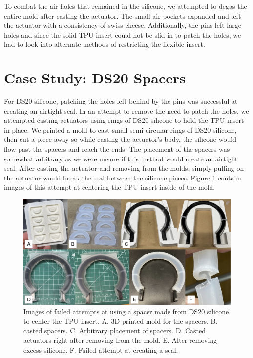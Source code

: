 To combat the air holes that remained in the silicone, we attempted to degas the entire mold after casting the actuator. The small air pockets expanded and left the actuator with a consistency of swiss cheese. Additionally, the pins left large holes and since the solid TPU insert could not be slid in to patch the holes, we had to look into alternate methods of restricting the flexible insert. 

\section{Case Study: DS20 Spacers}

For DS20 silicone, patching the holes left behind by the pins was successful at creating an airtight seal. In an attempt to remove the need to patch the holes, we attempted casting actuators using rings of DS20 silicone to hold the TPU insert in place. We printed a mold to cast small semi-circular rings of DS20 silicone, then cut a piece away so while casting the actuator's body, the silicone would flow past the spacers and reach the ends. The placement of the spacers was somewhat arbitrary as we were unsure if this method would create an airtight seal. After casting the actuator and removing from the molds, simply pulling on the actuator would break the seal between the silicone pieces. Figure \ref{fig:ds20spacer} contains images of this attempt at centering the TPU insert inside of the mold. 

\begin{figure}[h]
    \centering
    \includegraphics[width=6 in]{images4/ds20spacer.jpg}
    \caption{Images of failed attempts at using a spacer made from DS20 silicone to center the TPU insert. A. 3D printed mold for the spacers. B. casted spacers. C. Arbitrary placement of spacers. D. Casted actuators right after removing from the mold. E. After removing excess silicone. F. Failed attempt at creating a seal.}
    \label{fig:ds20spacer}
\end{figure}

